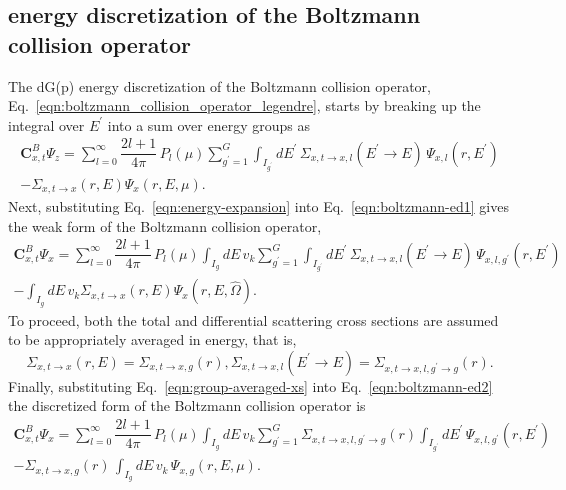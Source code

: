 \subsection{\dG energy discretization of the Boltzmann collision operator}
The dG(p) energy discretization of the Boltzmann collision operator, Eq.~\eqref{eqn:boltzmann_collision_operator_legendre}, starts by breaking up the integral over $E^{\prime}$ into a sum over energy groups as
\begin{multline} \label{eqn:boltzmann-ed1}
    \boldsymbol{C}_{x,t}^B \Psi_z = \sum_{l=0}^{\infty} \dfrac{2l+1}{4 \pi} \, P_l(\mu)  \sum_{g^{\prime}=1}^G \int_{I_{g^{\prime}}} 
    dE^{\prime} \, \Sigma_{x,t\rightarrow x, l}(E^{\prime} \rightarrow E) \, \Psi_{x,l}(r,E^{\prime}) \\
    - \Sigma_{x,t \rightarrow x}(r,E) \Psi_x(r,E,\mu).
\end{multline}
Next, substituting Eq.~\eqref{eqn:energy-expansion} into Eq.~\eqref{eqn:boltzmann-ed1} gives the weak form of the Boltzmann collision operator,
\begin{multline} \label{eqn:boltzmann-ed2}
    \boldsymbol{C}_{x,t}^B \Psi_x = \sum_{l=0}^{\infty} \dfrac{2l+1}{4 \pi} \, P_l(\mu) \int_{I_g} dE \, v_k  \sum_{g^{\prime}=1}^G \int_{I_{g^{\prime}}} 
    dE^{\prime} \, \Sigma_{x,t\rightarrow x, l}(E^{\prime} \rightarrow E) \, \Psi_{x,l,g^{\prime}}(r,E^{\prime}) \\
    - \int_{I_g} dE \, v_k \Sigma_{x,t\rightarrow x}(r,E) \Psi_x(r,E,\hat{\Omega}).
\end{multline}
To proceed, both the total and differential scattering cross sections are assumed to be appropriately averaged in energy, that is,
\begin{subequations} \label{eqn:group-averaged-xs}
    \begin{equation} 
        \Sigma_{x,t \rightarrow x}(r,E) = \Sigma_{x,t \rightarrow x, g}(r),
    \end{equation}
    \begin{equation}
        \Sigma_{x,t \rightarrow x,l}(E^{\prime} \rightarrow E) = \Sigma_{x,t\rightarrow x,l,g^{\prime}\rightarrow g}(r).
    \end{equation}
\end{subequations}
Finally, substituting Eq.~\eqref{eqn:group-averaged-xs} into Eq.~\eqref{eqn:boltzmann-ed2} the \dG discretized form of the Boltzmann collision operator is
\begin{multline} \label{eqn:boltzmann-ed3}
    \boldsymbol{C}_{x,t}^B \Psi_x = \sum_{l=0}^{\infty} \dfrac{2l+1}{4 \pi} \, P_l(\mu) \int_{I_g} dE \, v_k  \sum_{g^{\prime}=1}^G \Sigma_{x,t\rightarrow x,l,g^{\prime}\rightarrow g}(r) \int_{I_{g^{\prime}}} 
    dE^{\prime} \, \Psi_{x,l,g^{\prime}}(r,E^{\prime}) \\
    - \Sigma_{x,t\rightarrow x,g}(r) \, \int_{I_g} dE \, v_k \, \Psi_{x,g}(r,E,\mu).
\end{multline}

